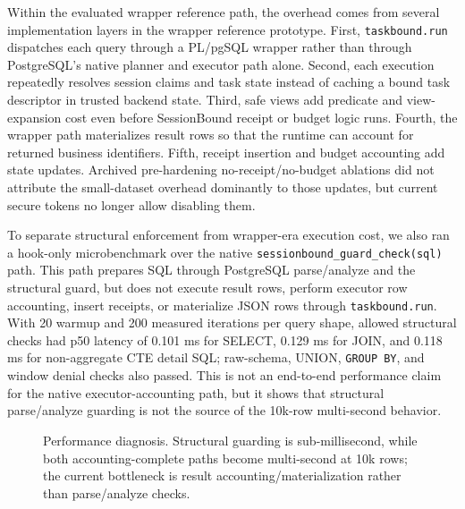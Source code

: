 \documentclass[journal]{IEEEtran}
\begin{document}
Within the evaluated wrapper reference path, the overhead comes from
several implementation layers in the wrapper reference prototype. First,
\texttt{taskbound.run} dispatches each query through a PL/pgSQL wrapper
rather than through PostgreSQL's native planner and executor path alone.
Second, each execution repeatedly resolves session claims and task state
instead of caching a bound task descriptor in trusted backend state.
Third, safe views add predicate and view-expansion cost even before
SessionBound receipt or budget logic runs. Fourth, the wrapper path
materializes result rows so that the runtime can account for returned
business identifiers. Fifth, receipt insertion and budget accounting add
state updates. Archived pre-hardening no-receipt/no-budget ablations did not
attribute the small-dataset overhead dominantly to those updates, but current
secure tokens no longer allow disabling them.

To separate structural enforcement from wrapper-era execution cost, we
also ran a hook-only microbenchmark over the native
\texttt{sessionbound\_guard\_check(sql)} path. This path prepares SQL
through PostgreSQL parse/analyze and the structural guard, but does not
execute result rows, perform executor row accounting, insert receipts, or
materialize JSON rows through \texttt{taskbound.run}. With 20 warmup and
200 measured iterations per query shape, allowed structural checks had
p50 latency of 0.101 ms for SELECT, 0.129 ms for JOIN, and 0.118 ms for
non-aggregate CTE detail SQL; raw-schema, UNION, \texttt{GROUP\ BY}, and
window denial checks also passed. This is not an end-to-end performance claim for the native
executor-accounting path, but it shows that structural parse/analyze
guarding is not the source of the 10k-row multi-second behavior.

\begin{figure}[!t]
\centering
\scriptsize
{}
\caption{Performance diagnosis. Structural guarding is sub-millisecond,
while both accounting-complete paths become multi-second at 10k rows;
the current bottleneck is result accounting/materialization rather than
parse/analyze checks.}
\label{fig:performance-diagnosis}
\end{figure}
\end{document}
